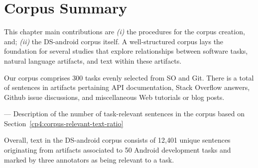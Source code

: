 
\section{Corpus Summary}
\label{cp4:corpus-summary}

This chapter main contributions are \textit{(i)} the procedures for the corpus creation, and; \textit{(ii)} the \acs{DS-android} corpus itself. A well-structured corpus lays the foundation for several studies that explore relationships between software tasks, natural language artifacts, and text within these artifacts. 

Our corpus comprises 300 tasks evenly selected from SO and Git. 
There is a total of  sentences in  artifacts pertaining API documentation, Stack Overflow answers, Github issue discussions, and miscellaneous Web tutorials or blog posts. 

--- Description of the number of task-relevant sentences in the corpus based on Section~\ref{cp4:corpus-relevant-text-ratio}

Overall, text in 
the \acs{DS-android} corpus consists of  
12,401 unique sentences
originating from artifacts associated to 50 Android development tasks and 
marked by three annotators as being relevant
to a task. 









